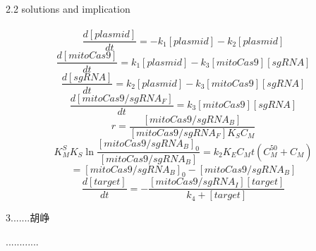 \documentclass[UTF8]{ctexart}%
\begin{document}
	\\\\
	{\Large 2.2 solutions and implication} 
	\\\\
	\begin{equation}
\frac{d[plasmid]}{dt}=-k_1[plasmid]-k_2[plasmid]\tag{1}
	\end{equation}
	\begin{equation}
	\frac{d[mitoCas9]}{dt}=k_1[plasmid]-k_3[mitoCas9][sgRNA]\tag{2}
	\end{equation}
	\begin{equation}
	\frac{d[sgRNA]}{dt}=k_2[plasmid]-k_3[mitoCas9][sgRNA]\tag{3}
	\end{equation}
	\begin{equation}
	\frac{d[mitoCas9/sgRNA_F]}{dt}=k_3[mitoCas9][sgRNA]\tag{4}
	\end{equation}
	\begin{equation}
    r=\frac{[mitoCas9/sgRNA_B]}{[mitoCas9/sgRNA_F]K_S C_M}\tag{5}
	\end{equation}
	\begin{equation}
	K_M^SK_S\ln\frac{[mitoCas9/sgRNA_B]_0}{[mitoCas9/sgRNA_B]}=k_2K_EC_Mt (C_M^{50}+C_M)\tag{6}
	\end{equation}
	\begin{equation}
    [mitoCas9/sgRNA_I]= [mitoCas9/sgRNA_B]_0-[mitoCas9/sgRNA_B]\tag{7}
	\end{equation}
	\begin{equation}
	\frac{d[target]}{dt}=-\frac{[mitoCas9/sgRNA_I][target]}{k_4+[target]}\tag{8}
	\end{equation}
	\begin{center}
	{\Large 3.......胡峥}
	\end{center}
............
\end{document}
